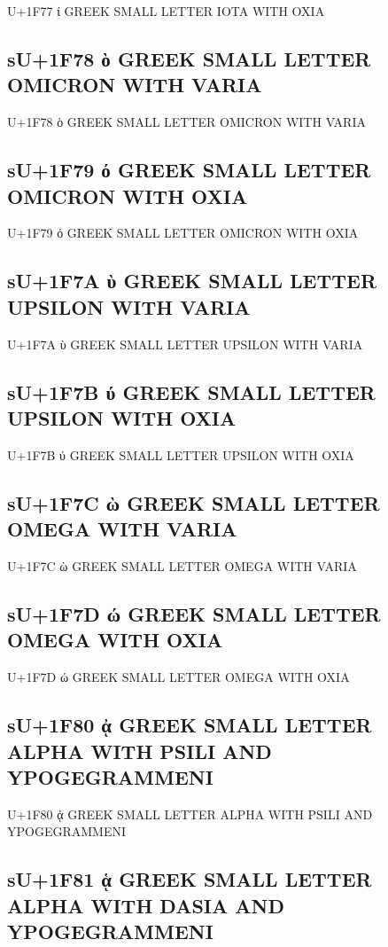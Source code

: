 U+1F77 ί GREEK SMALL LETTER IOTA WITH OXIA

\subsection{sU+1F78 ὸ GREEK SMALL LETTER OMICRON WITH VARIA}

U+1F78 ὸ GREEK SMALL LETTER OMICRON WITH VARIA

\subsection{sU+1F79 ό GREEK SMALL LETTER OMICRON WITH OXIA}

U+1F79 ό GREEK SMALL LETTER OMICRON WITH OXIA

\subsection{sU+1F7A ὺ GREEK SMALL LETTER UPSILON WITH VARIA}

U+1F7A ὺ GREEK SMALL LETTER UPSILON WITH VARIA

\subsection{sU+1F7B ύ GREEK SMALL LETTER UPSILON WITH OXIA}

U+1F7B ύ GREEK SMALL LETTER UPSILON WITH OXIA

\subsection{sU+1F7C ὼ GREEK SMALL LETTER OMEGA WITH VARIA}

U+1F7C ὼ GREEK SMALL LETTER OMEGA WITH VARIA

\subsection{sU+1F7D ώ GREEK SMALL LETTER OMEGA WITH OXIA}

U+1F7D ώ GREEK SMALL LETTER OMEGA WITH OXIA

\subsection{sU+1F80 ᾀ GREEK SMALL LETTER ALPHA WITH PSILI AND YPOGEGRAMMENI}

U+1F80 ᾀ GREEK SMALL LETTER ALPHA WITH PSILI AND YPOGEGRAMMENI

\subsection{sU+1F81 ᾁ GREEK SMALL LETTER ALPHA WITH DASIA AND YPOGEGRAMMENI}

